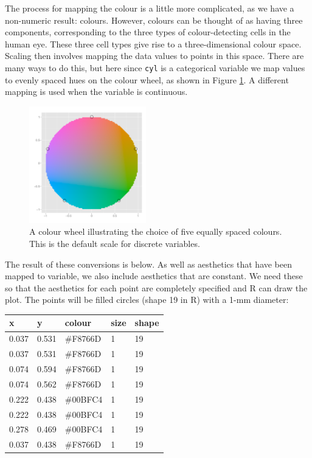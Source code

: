 The process for mapping the colour is a little more complicated, as we
have a non-numeric result: colours. However, colours can be thought of
as having three components, corresponding to the three types of
colour-detecting cells in the human eye. These three cell types give
rise to a three-dimensional colour space. Scaling then involves mapping
the data values to points in this space. There are many ways to do this,
but here since \texttt{cyl} is a categorical variable we map values to
evenly spaced hues on the colour wheel, as shown in Figure
\ref{fig:colour-wheel}. A different mapping is used when the variable is
continuous. 

\begin{figure}[htbp]
  \centering
    \includegraphics[width=2in]{diagrams/colour-wheel}
  \caption{A colour wheel illustrating the choice of five equally spaced colours. This is the default scale for discrete variables.}
  \label{fig:colour-wheel}
\end{figure}

The result of these conversions is below. As well as aesthetics that
have been mapped to variable, we also include aesthetics that are
constant. We need these so that the aesthetics for each point are
completely specified and R can draw the plot. The points will be filled
circles (shape 19 in R) with a 1-mm diameter:

\begin{longtable}[c]{@{}lllll@{}}
\toprule
x & y & colour & size & shape\tabularnewline
\midrule
\endhead
0.037 & 0.531 & \#F8766D & 1 & 19\tabularnewline
0.037 & 0.531 & \#F8766D & 1 & 19\tabularnewline
0.074 & 0.594 & \#F8766D & 1 & 19\tabularnewline
0.074 & 0.562 & \#F8766D & 1 & 19\tabularnewline
0.222 & 0.438 & \#00BFC4 & 1 & 19\tabularnewline
0.222 & 0.438 & \#00BFC4 & 1 & 19\tabularnewline
0.278 & 0.469 & \#00BFC4 & 1 & 19\tabularnewline
0.037 & 0.438 & \#F8766D & 1 & 19\tabularnewline
\bottomrule
\end{longtable}

